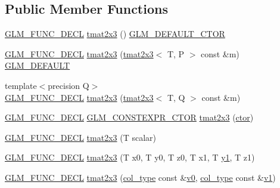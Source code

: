 \subsection*{Public Member Functions}
\begin{DoxyCompactItemize}
\item 
\mbox{\hyperlink{setup_8hpp_ab2d052de21a70539923e9bcbf6e83a51}{G\+L\+M\+\_\+\+F\+U\+N\+C\+\_\+\+D\+E\+CL}} \mbox{\hyperlink{structglm_1_1tmat2x3_afefe2e6e3e0a1e616dcf4f930827f5d1}{tmat2x3}} () \mbox{\hyperlink{setup_8hpp_afb97a4e995bc004c0cbbfa22125b80ba}{G\+L\+M\+\_\+\+D\+E\+F\+A\+U\+L\+T\+\_\+\+C\+T\+OR}}
\item 
\mbox{\hyperlink{setup_8hpp_ab2d052de21a70539923e9bcbf6e83a51}{G\+L\+M\+\_\+\+F\+U\+N\+C\+\_\+\+D\+E\+CL}} \mbox{\hyperlink{structglm_1_1tmat2x3_a8552e4158f1d2e3fa2aac635585e7f94}{tmat2x3}} (\mbox{\hyperlink{structglm_1_1tmat2x3}{tmat2x3}}$<$ T, P $>$ const \&m) \mbox{\hyperlink{setup_8hpp_aefce7051c376a64ba89fa93a9f63bc2c}{G\+L\+M\+\_\+\+D\+E\+F\+A\+U\+LT}}
\item 
{\footnotesize template$<$precision Q$>$ }\\\mbox{\hyperlink{setup_8hpp_ab2d052de21a70539923e9bcbf6e83a51}{G\+L\+M\+\_\+\+F\+U\+N\+C\+\_\+\+D\+E\+CL}} \mbox{\hyperlink{structglm_1_1tmat2x3_ae12411a80e806874d766c81fcb5b55b3}{tmat2x3}} (\mbox{\hyperlink{structglm_1_1tmat2x3}{tmat2x3}}$<$ T, Q $>$ const \&m)
\item 
\mbox{\hyperlink{setup_8hpp_ab2d052de21a70539923e9bcbf6e83a51}{G\+L\+M\+\_\+\+F\+U\+N\+C\+\_\+\+D\+E\+CL}} \mbox{\hyperlink{setup_8hpp_ad34178a09666081abdb573c14d1f4a5a}{G\+L\+M\+\_\+\+C\+O\+N\+S\+T\+E\+X\+P\+R\+\_\+\+C\+T\+OR}} \mbox{\hyperlink{structglm_1_1tmat2x3_a482495a0bffdab216b44ed01cfe5a5ef}{tmat2x3}} (\mbox{\hyperlink{namespaceglm_a807df837905ec286f806a536af03b57f}{ctor}})
\item 
\mbox{\hyperlink{setup_8hpp_ab2d052de21a70539923e9bcbf6e83a51}{G\+L\+M\+\_\+\+F\+U\+N\+C\+\_\+\+D\+E\+CL}} \mbox{\hyperlink{structglm_1_1tmat2x3_aec88961ebded543fe8c8ebaf9494f554}{tmat2x3}} (T scalar)
\item 
\mbox{\hyperlink{setup_8hpp_ab2d052de21a70539923e9bcbf6e83a51}{G\+L\+M\+\_\+\+F\+U\+N\+C\+\_\+\+D\+E\+CL}} \mbox{\hyperlink{structglm_1_1tmat2x3_a51d97af8b49ffdf7ad2b75542cbcbfdc}{tmat2x3}} (T x0, T y0, T z0, T x1, T \mbox{\hyperlink{glad_8h_a48340161068d267815ac3131e9d03def}{y1}}, T z1)
\item 
\mbox{\hyperlink{setup_8hpp_ab2d052de21a70539923e9bcbf6e83a51}{G\+L\+M\+\_\+\+F\+U\+N\+C\+\_\+\+D\+E\+CL}} \mbox{\hyperlink{structglm_1_1tmat2x3_a4321710182d684f5fd821657c2c950ec}{tmat2x3}} (\mbox{\hyperlink{structglm_1_1tmat2x3_a62523fc3d245c37e15d68c3b9729f366}{col\+\_\+type}} const \&\mbox{\hyperlink{glad_8h_a7062a23d1d434121d4a88f530703d06a}{v0}}, \mbox{\hyperlink{structglm_1_1tmat2x3_a62523fc3d245c37e15d68c3b9729f366}{col\+\_\+type}} const \&\mbox{\hyperlink{glad_8h_a0779c3b73f9aa3a0ac5b0139b5d291d9}{v1}})

\end{DoxyCompactItemize}
